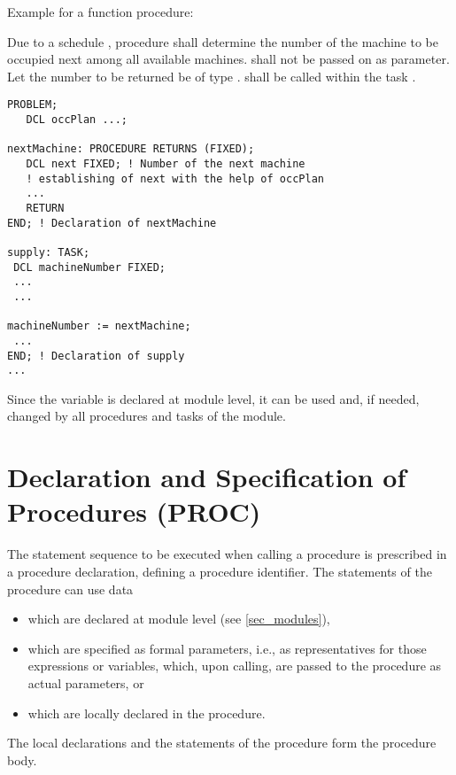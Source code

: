 Example for a function procedure:

Due to a schedule , procedure  shall determine the
number of the machine to be occupied next among all available machines.
 shall not be passed on as parameter. Let the number to be
returned be of type .  shall be called
within the task .

\begin{lstlisting}
PROBLEM;
   DCL occPlan ...; 

nextMachine: PROCEDURE RETURNS (FIXED);
   DCL next FIXED; ! Number of the next machine
   ! establishing of next with the help of occPlan
   ...
   RETURN
END; ! Declaration of nextMachine

supply: TASK;
 DCL machineNumber FIXED;
 ... 
 ...

machineNumber := nextMachine;
 ... 
END; ! Declaration of supply
...
\end{lstlisting}

Since the variable  is declared at module level, it can be used
and, if needed, changed by all procedures and tasks of the module.

\section{Declaration and Specification of Procedures (PROC)}  %
\label{sec_proc_dcl}

The statement sequence to be executed when calling a procedure is
prescribed in a procedure declaration, defining a procedure identifier.
The statements of the procedure can use data
\begin{itemize}
\item which are declared at module level
(see \ref{sec_modules}),
\item which are specified as formal parameters, i.e., as representatives
for those expressions or variables, which, upon calling, are passed
to the procedure as actual parameters, or
\item which are locally declared in the procedure.
\end{itemize}

The local declarations and the statements of the procedure form the
procedure body.

